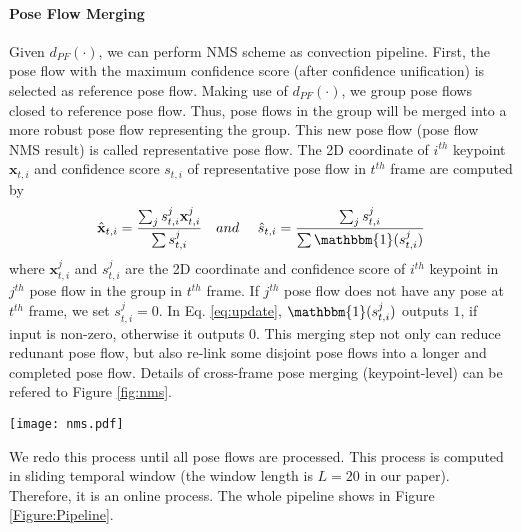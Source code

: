 \documentclass{bmvc2k}
\begin{document}
\paragraph{Pose Flow Merging}
Given $d_{PF}(\cdot)$, we can perform NMS scheme as convection pipeline. First, the pose flow with the maximum confidence score (after confidence unification) is selected as reference pose flow. Making use of $d_{PF}(\cdot)$, we group pose flows closed to reference pose flow. Thus, pose flows in the group will be merged into a more robust pose flow representing the group. This new pose flow 
(pose flow NMS result) is called representative pose flow. The 2D coordinate of $i^{th}$ keypoint $\textbf{x}_{t,i}$ and confidence score $s_{t,i}$ of representative pose flow in $t^{th}$ frame are computed by
\vspace{-2mm}
\begin{equation}
\begin{aligned}
 \hat{\textbf{x}}_{t,i} = \frac{\sum_{j} s_{t,i}^j \textbf{x}_{t,i}^j}{\sum s_{t,i}^j} ~~~and~~~~
 \hat{s}_{t,i} = \frac{\sum_{j} s_{t,i}^j}{\sum \mathbbm{1}(s_{t,i}^j) } \\
 \label{eq:update}
\end{aligned}
\vspace{-6mm}
\end{equation}
where $\textbf{x}_{t,i}^j$ and $s_{t,i}^j$ are the 2D coordinate and confidence score of $i^{th}$ keypoint in $j^{th}$ pose flow in the group in $t^{th}$ frame. If $j^{th}$ pose flow does not have any pose at $t^{th}$ frame, we set $s_{t,i}^j = 0$. In Eq. \ref{eq:update}, $\mathbbm{1}(s_{t,i}^j)$ outputs $1$, if input is non-zero, otherwise it outputs $0$. This merging step not only can reduce redunant pose flow, but also re-link some disjoint pose flows into a longer and completed pose flow. Details of cross-frame pose merging (keypoint-level) can be refered to Figure \ref{fig:nms}.

\begin{figure*}[!ht]
\centering
\texttt{[image: nms.pdf]} 
\caption{Pose Flow Merging}
\label{fig:nms}
\vspace{-2mm}
\end{figure*}


We redo this process until all pose flows are processed. This process is computed in sliding temporal window (the window length is $L=20$ in our paper). Therefore, it is an online process. The whole pipeline shows in Figure \ref{Figure:Pipeline}.

\vspace{-3mm}
\end{document}
